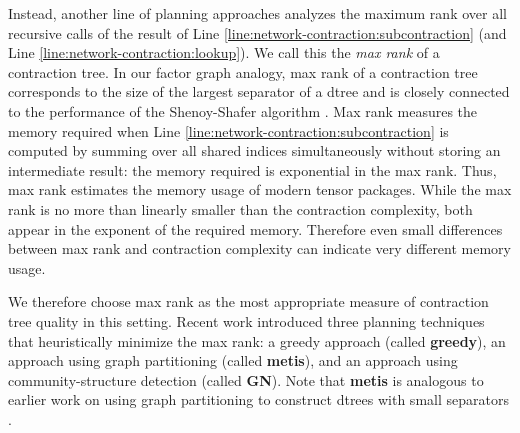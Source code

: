 Instead, another line of planning approaches analyzes the maximum rank over all recursive calls of the result of Line \ref{line:network-contraction:subcontraction} (and Line \ref{line:network-contraction:lookup}). We call this the \emph{max rank} of a contraction tree. In our factor graph analogy, max rank of a contraction tree corresponds to the size of the largest separator of a dtree \cite{darwiche01b} and is closely connected to the performance of the Shenoy-Shafer algorithm \cite{shenoy97,SS08}. Max rank measures the memory required when Line \ref{line:network-contraction:subcontraction} is computed by summing over all shared indices simultaneously without storing an intermediate result: the memory required is exponential in the max rank. Thus, max rank estimates the memory usage of modern tensor packages. While the max rank is no more than linearly smaller than the contraction complexity, both appear in the exponent of the required memory. Therefore even small differences between max rank and contraction complexity can indicate very different memory usage. 

We therefore choose max rank as the most appropriate measure of contraction tree quality in this setting. 
Recent work \cite{KCMR18} introduced three planning techniques that heuristically minimize the max rank: a greedy approach (called \textbf{greedy}), an approach using graph partitioning (called \textbf{metis}), and an approach using community-structure detection (called \textbf{GN}). Note that \textbf{metis} is analogous to earlier work on using graph partitioning to construct dtrees with small separators \cite{darwiche01b}.